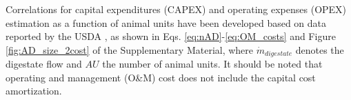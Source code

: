 \begin{refsection}[referencesCh6]
%

Correlations for capital expenditures (CAPEX) and operating expenses (OPEX) estimation as a function of animal units have been developed based on data reported by the USDA \citep{USDAOM}, as shown in Eqs. \ref{eq:nAD}-\ref{eq:OM_costs} and Figure \ref{fig:AD_size_2cost} of the Supplementary Material, where $\dot{m}_{digestate}$ denotes the digestate flow and $AU$ the number of animal units. It should be noted that operating and management (O\&M) cost does not include the capital cost amortization.



\end{refsection}
